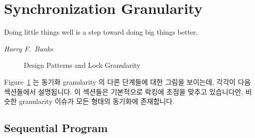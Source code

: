 \section{Synchronization Granularity}
\label{sec:SMPdesign:Synchronization Granularity}
%
\epigraph{Doing little things well is a step toward doing big things better.}
	 {\emph{Harry F.~Banks}}

\begin{figure}[tb]
\centering
{}
\caption{Design Patterns and Lock Granularity}
\label{fig:SMPdesign:Design Patterns and Lock Granularity}
\end{figure}

Figure~\ref{fig:SMPdesign:Design Patterns and Lock Granularity}
는 동기화 granularity 의 다른 단계들에 대한 그림을 보이는데, 각각이 다음
섹션들에서 설명됩니다.
이 섹션들은 기본적으로 락킹에 초점을 맞추고 있습니다만, 비슷한 granularity
이슈가 모든 형태의 동기화에 존재합니다.

\subsection{Sequential Program}
\label{sec:SMPdesign:Sequential Program}

